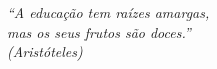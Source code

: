 \begin{epigrafe}
    \vspace*{\fill}
	\begin{flushright}
		\textit{``A educação tem raízes amargas, \\
                  mas os seus frutos são doces.''\\
		          (Aristóteles)}
	\end{flushright}
\end{epigrafe}
